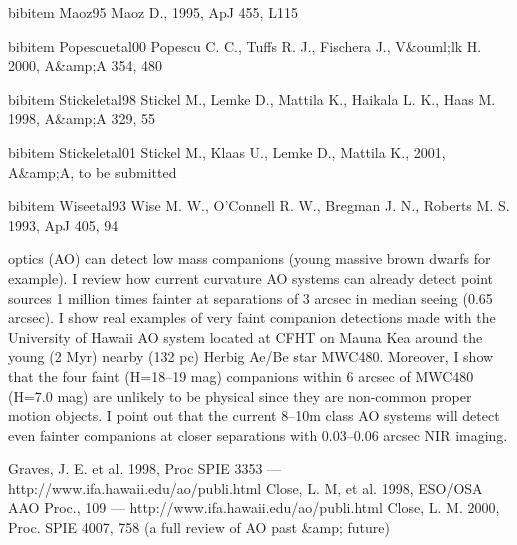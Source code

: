 {{{{{{{{{{{{{{%

bibitem {Maoz95} Maoz D., 1995, ApJ 455, L115

bibitem {Popescuetal00} Popescu C. C., Tuffs R. J., Fischera J., V&ouml;lk H. 2000, A&amp;A 354, 480

bibitem {Stickeletal98} Stickel M., Lemke D., Mattila K., Haikala L. K., Haas M. 1998, A&amp;A 329, 55

bibitem {Stickeletal01} Stickel M., Klaas U., Lemke D., Mattila K., 2001, A&amp;A, to be submitted

bibitem {Wiseetal93} Wise M. W., O'Connell R. W., Bregman J. N., Roberts M. S. 1993, ApJ 405, 94



optics (AO) can detect low mass companions (young massive brown dwarfs
for example). I review how current curvature AO systems can already
detect point sources 1 million times fainter at separations of 3
arcsec in median seeing (0.65 arcsec). I show real examples of very
faint companion detections made with the University of Hawaii AO
system located at CFHT on Mauna Kea around the young (2 Myr) nearby
(132 pc) Herbig Ae/Be star MWC480.  Moreover, I show that the four
faint (H=18--19 mag) companions within 6 arcsec of MWC480 (H=7.0 mag)
are unlikely to be physical since they are non-common proper motion
objects. I point out that the current 8--10m class AO systems will
detect even fainter companions at closer separations with 0.03--0.06
arcsec NIR imaging.

 Graves, J. E. et al. 1998, Proc SPIE 3353
--- http://www.ifa.hawaii.edu/ao/publi.html
 Close, L. M, et al. 1998, ESO/OSA AAO Proc., 109
--- http://www.ifa.hawaii.edu/ao/publi.html
 Close, L. M. 2000, Proc. SPIE 4007, 758
(a full review of AO past &amp; future)




}}}}}}}}}}}}}}

